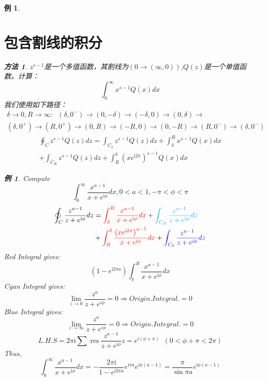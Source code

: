 \documentclass[10pt, a4paper, oneside]{ctexbook}
\newtheorem{example}[theorem]{例}
\newtheorem{method}[theorem]{方法}
\begin{document}
\begin{example}
    \section{包含割线的积分}
    \begin{method}
        $z^{s-1}$是一个多值函数，其割线为$(0\to (\infty,0))$,$Q(z)$是一个单值函数。计算：
        $$\int_{0}^{\infty} x^{s-1} Q(x) d x$$
        我们使用如下路径：
        \begin{align*}
            \delta\to0,R\to\infty:\;\;(\delta,0^-)\to(0,-\delta)\to(-\delta,0)\to(0,\delta)\to \\
            (\delta,0^+)\to(R,0^+)\to(0,R)\to(-R,0)\to(0,-R)\to(R,0^-)\to(\delta,0^-)
        \end{align*}
        $$
            \begin{aligned}
                \oint_{C} z^{s-1} Q(z) d z=\int_{C_{\delta}} z^{s-1} Q(z) d z+\int_{\delta}^{R} x^{s-1} Q(x) d x \\
                +\int_{C_{R}} z^{s-1} Q(z) d z+\int_{R}^{\delta}\left(x e^{\mathrm{i} 2 \pi}\right)^{s-1} Q(x) d x
            \end{aligned}
        $$
    \end{method}
    \begin{example}
        Compute $$\int_{0}^{\infty} \frac{x^{a-1}}{x+e^{\mathrm{i} \phi}} d x, 0<a<1,-\pi<\phi<\pi$$\rm
        \begin{align*}
            \oint_{C} \frac{z^{a-1}}{z+e^{\mathrm{i} \phi}} d z & ={\color{red}\int_{\delta}^{R} \frac{x^{a-1}}{x+e^{\mathrm{i} \phi}} d x}+{\color{cyan}\int_{C_{R}} \frac{z^{a-1}}{z+e^{\mathrm{i} \phi}} d z}                                         \\
                                                                & +{\color{red} \int_{R}^{\delta} \frac{\left(x e^{\mathrm{i} 2 \pi}\right)^{a-1}}{x+e^{\mathrm{i} \phi}} d x}+{\color{blue}\int_{C_{\delta}} \frac{z^{a-1}}{z+e^{\mathrm{i} \phi}} d z}
        \end{align*}
        {\color{red} Red Integral} gives:
        $$
            \left(1-e^{\mathrm{i} 2 \pi a}\right) \int_{\delta}^{R} \frac{x^{a-1}}{x+e^{\mathrm{i} \phi}} d x
        $$
        {\color{cyan} Cyan Integral} gives:
        $$
            \lim_{z\to 0}\frac{z^a}{z+e^{i\phi}}=0\Rightarrow
            Origin.Integral.=0
        $$
        {\color{blue} Blue Integral} gives:
        $$
            \lim_{z\to \infty}\frac{z^a}{z+e^{i\phi}}=0\Rightarrow
            Origin.Integral.=0
        $$
        $$
            L.H.S=2 \pi \mathrm{i} \sum \operatorname{res} \frac{z^{a-1}}{z+e^{\mathrm{i} \phi}} z=e^{\mathrm{i}(\phi+\pi)}\;\;( 0<\phi+\pi<2 \pi)
        $$
        Thus,
        $$
            \int_{0}^{\infty} \frac{x^{a-1}}{x+e^{\mathrm{i} \phi}} d x=-\frac{2 \pi \mathrm{i}}{1-e^{\mathrm{i} 2 \pi a}} e^{\mathrm{i} \pi a} e^{\mathrm{i} \phi(a-1)}=\frac{\pi}{\sin \pi a} e^{\mathrm{i} \phi(a-1)}
        $$
    \end{example}
\end{example}
\end{document}
